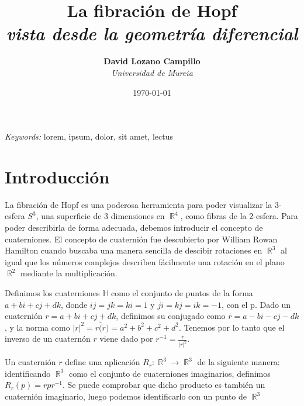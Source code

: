 \documentclass[11pt]{diazessay} %
\title{\textbf{La fibración de Hopf} \\ {\Large\itshape vista desde la geometría diferencial}} %
\author{\textbf{David Lozano Campillo} \\ \textit{Universidad de Murcia}} %
\date{\today} %
\DeclareMathOperator{\R}{\mathbb{R}}
\begin{document}
\maketitle %



\begin{abstract}

\end{abstract}

\hspace*{3.6mm}\textit{Keywords:} lorem, ipsum, dolor, sit amet, lectus %

\vspace{30pt} 


\section*{Introducción}

La fibración de Hopf es una poderosa herramienta para poder visualizar la 3-esfera $S^3$, una superficie de 3 dimensiones en $\R^4$, como fibras de la 2-esfera. Para poder describirla de forma adecuada, debemos introducir el concepto de cuaterniones. El concepto de cuaternión fue descubierto por William Rowan Hamilton cuando buscaba una manera sencilla de descibir rotaciones en $\R^3$ al igual que los números complejos describen fácilmente una rotación en el plano $\R^2$ mediante la multiplicación.

Definimos los cuaterniones $\mathbb{H}$ como el conjunto de puntos de la forma $a+bi+cj+dk$, donde $ij=jk=ki=1$ y $ji=kj=ik=-1$, con el p. Dado un cuaternión $r=a+bi+cj+dk$, definimos su conjugado como $\bar{r}=a-bi-cj-dk$, y la norma como $|r|^2 = r\bar(r) = a^2+b^2+c^2+d^2$. Tenemos por lo tanto que el inverso de un cuaternón $r$ viene dado por $r^{-1}=\frac{\bar{r}}{|r|^2}$.

Un cuaternión $r$ define una aplicación $R_r:\R^3\to\R^3$ de la siguiente manera: identificando $\R^3$ como el conjunto de cuaterniones imaginarios, definimos $R_r(p) = rpr^{-1}$. Se puede comprobar que dicho producto es también un cuaternión imaginario, luego podemos identificarlo con un punto de $\R^3$
\end{document}
